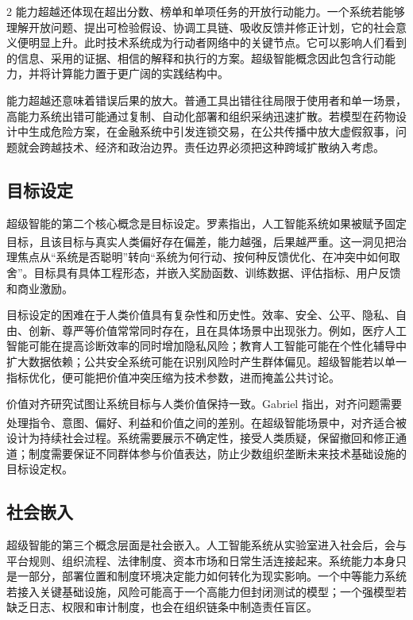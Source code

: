 \documentclass[a4paper,UTF8,zihao=5,twoside]{ctexart}
\newcommand{\upcite}[1]{\textsuperscript{\cite{#1}}}
\begin{document}
\begin{multicols}{2}
能力超越还体现在超出分数、榜单和单项任务的开放行动能力。一个系统若能够理解开放问题、提出可检验假设、协调工具链、吸收反馈并修正计划，它的社会意义便明显上升。此时技术系统成为行动者网络中的关键节点。它可以影响人们看到的信息、采用的证据、相信的解释和执行的方案。超级智能概念因此包含行动能力，并将计算能力置于更广阔的实践结构中。

能力超越还意味着错误后果的放大。普通工具出错往往局限于使用者和单一场景，高能力系统出错可能通过复制、自动化部署和组织采纳迅速扩散。若模型在药物设计中生成危险方案，在金融系统中引发连锁交易，在公共传播中放大虚假叙事，问题就会跨越技术、经济和政治边界。责任边界必须把这种跨域扩散纳入考虑。

\subsection{目标设定}

超级智能的第二个核心概念是目标设定。罗素指出，人工智能系统如果被赋予固定目标，且该目标与真实人类偏好存在偏差，能力越强，后果越严重\upcite{russell2019}。这一洞见把治理焦点从“系统是否聪明”转向“系统为何行动、按何种反馈优化、在冲突中如何取舍”。目标具有具体工程形态，并嵌入奖励函数、训练数据、评估指标、用户反馈和商业激励。

目标设定的困难在于人类价值具有复杂性和历史性。效率、安全、公平、隐私、自由、创新、尊严等价值常常同时存在，且在具体场景中出现张力。例如，医疗人工智能可能在提高诊断效率的同时增加隐私风险；教育人工智能可能在个性化辅导中扩大数据依赖；公共安全系统可能在识别风险时产生群体偏见。超级智能若以单一指标优化，便可能把价值冲突压缩为技术参数，进而掩盖公共讨论。

价值对齐研究试图让系统目标与人类价值保持一致。Gabriel 指出，对齐问题需要处理指令、意图、偏好、利益和价值之间的差别\upcite{gabriel2020}。在超级智能场景中，对齐适合被设计为持续社会过程。系统需要展示不确定性，接受人类质疑，保留撤回和修正通道；制度需要保证不同群体参与价值表达，防止少数组织垄断未来技术基础设施的目标设定权。

\subsection{社会嵌入}

超级智能的第三个概念层面是社会嵌入。人工智能系统从实验室进入社会后，会与平台规则、组织流程、法律制度、资本市场和日常生活连接起来。系统能力本身只是一部分，部署位置和制度环境决定能力如何转化为现实影响。一个中等能力系统若接入关键基础设施，风险可能高于一个高能力但封闭测试的模型；一个强模型若缺乏日志、权限和审计制度，也会在组织链条中制造责任盲区。


\end{multicols}
\end{document}
